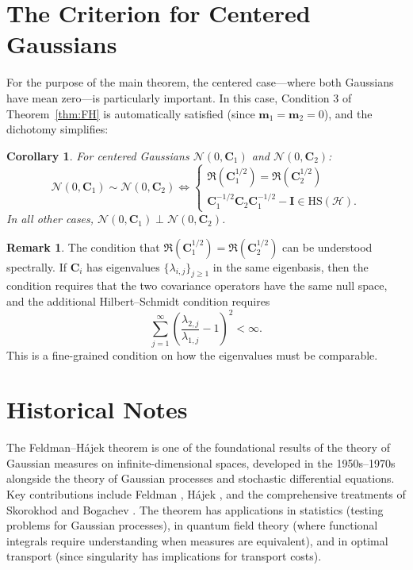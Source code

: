 \documentclass[12pt, oneside]{book}
\theoremstyle{plain}
\newtheorem{corollary}[theorem]{Corollary}
\theoremstyle{definition}
\newtheorem{remark}[theorem]{Remark}
\newcommand{\calH}{\mathcal{H}}
\newcommand{\calN}{\mathcal{N}}
\newcommand{\ran}{\mathfrak{R}}
\renewcommand{\geq}{\geqslant}
\begin{document}
\section{The Criterion for Centered Gaussians}

For the purpose of the main theorem, the centered case---where both Gaussians have mean zero---is particularly important. In this case, Condition 3 of Theorem~\ref{thm:FH} is automatically satisfied (since $\mathbf{m}_1 = \mathbf{m}_2 = 0$), and the dichotomy simplifies:

\begin{corollary}
\label{cor:centered}
For centered Gaussians $\calN(0, \mathbf{C}_1)$ and $\calN(0, \mathbf{C}_2)$:
\begin{equation}
\calN(0, \mathbf{C}_1) \sim \calN(0, \mathbf{C}_2) \iff 
\begin{cases}
\ran(\mathbf{C}_1^{1/2}) = \ran(\mathbf{C}_2^{1/2}) \\
\mathbf{C}_1^{-1/2} \mathbf{C}_2 \mathbf{C}_1^{-1/2} - \mathbf{I} \in \mathrm{HS}(\calH).
\end{cases}
\end{equation}
In all other cases, $\calN(0, \mathbf{C}_1) \perp \calN(0, \mathbf{C}_2)$.
\end{corollary}

\begin{remark}
The condition that $\ran(\mathbf{C}_1^{1/2}) = \ran(\mathbf{C}_2^{1/2})$ can be understood spectrally. If $\mathbf{C}_i$ has eigenvalues $\{\lambda_{i,j}\}_{j \geq 1}$ in the same eigenbasis, then the condition requires that the two covariance operators have the same null space, and the additional Hilbert--Schmidt condition requires
\begin{equation}
\sum_{j=1}^{\infty} \left(\frac{\lambda_{2,j}}{\lambda_{1,j}} - 1\right)^2 < \infty.
\end{equation}
This is a fine-grained condition on how the eigenvalues must be comparable.
\end{remark}

\section{Historical Notes}

The Feldman--H\'ajek theorem is one of the foundational results of the theory of Gaussian measures on infinite-dimensional spaces, developed in the 1950s--1970s alongside the theory of Gaussian processes and stochastic differential equations. Key contributions include Feldman \cite{Feldman1958}, H\'ajek \cite{Hajek1958}, and the comprehensive treatments of Skorokhod \cite{Skorokhod1974} and Bogachev \cite{Bogachev1998}. The theorem has applications in statistics (testing problems for Gaussian processes), in quantum field theory (where functional integrals require understanding when measures are equivalent), and in optimal transport (since singularity has implications for transport costs).
\end{document}
